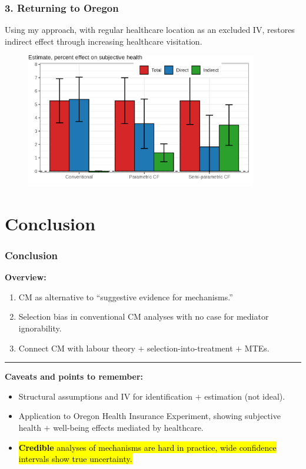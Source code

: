 \documentclass[dvipsnames]{beamer} %
\makeatletter
\let\HL\hl
\renewcommand\hl{%
    \let\set@color\beamerorig@set@color
    \let\reset@color\beamerorig@reset@color
    \HL}
\makeatother
\begin{document}
\begin{frame}
    \frametitle{3. Returning to Oregon}
    Using my approach, with regular healthcare location as an excluded IV, restores indirect effect through increasing healthcare visitation.
    \vskip0.5cm
    
    \begin{figure}
        \centering
        \includegraphics[width=0.9\textwidth]{
            ../text/sections/figures/mediation-health.png}
    \end{figure}
\end{frame}
\section{Conclusion}
\begin{frame}
    \frametitle{Conclusion}
    \textbf{Overview:}
    \begin{enumerate}
        \item CM as alternative to ``suggestive evidence for mechanisms.''
        \item Selection bias in conventional CM analyses with no case for mediator ignorability.
        \item Connect CM with labour theory $+$ selection-into-treatment $+$ MTEs.
    \end{enumerate}
    \par\noindent\rule{\textwidth}{0.4pt}

    \textbf{Caveats and points to remember:}
    \begin{itemize}
        \item Structural assumptions and IV for identification $+$ estimation (not ideal).
        \item Application to Oregon Health Insurance Experiment, showing subjective health $+$ well-being effects mediated by healthcare.
        \item \hl{\textbf{Credible} analyses of mechanisms are hard in practice, wide confidence intervals show true uncertainty.}
    \end{itemize}
\end{frame}
\end{document}
